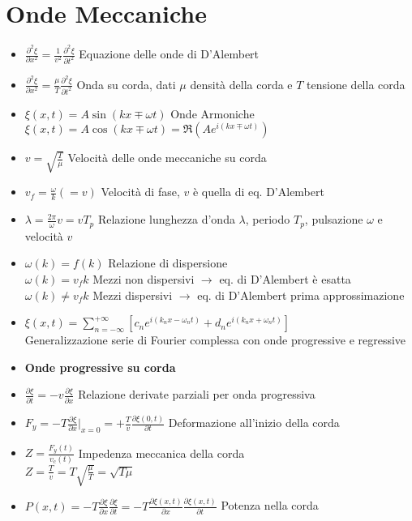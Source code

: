 \documentclass[a4paper]{article}
\begin{document}
\section{Onde Meccaniche}
 \begin{itemize}
 	\item $\frac{\partial^2 \xi}{\partial x^2}=\frac{1}{v^2} \frac{\partial^2 \xi}{\partial t^2}$ Equazione delle onde di D'Alembert
 	\item $\frac{\partial^2 \xi}{\partial x^2}=\frac{\mu}{T} \frac{\partial^2 \xi}{\partial t^2}$ Onda su corda, dati $\mu$ densità della corda e $T$ tensione della corda
 	\item $\xi(x,t)=A \sin(kx \mp \omega t)$ Onde Armoniche\\
 	$\xi(x,t)=A \cos(kx \mp \omega t)= \Re(Ae^{i(kx \mp \omega t)})$
 	\item $v=\sqrt{\frac{T}{\mu}}$ Velocità delle onde meccaniche su corda
 	\item $v_f = \frac{\omega}{k} (=v)$ Velocità di fase, $v$ è quella di eq. D'Alembert
 	\item $\lambda = \frac{2 \pi}{\omega}v=v T_p$ Relazione lunghezza d'onda $\lambda$, periodo $T_p$, pulsazione $\omega$ e velocità $v$
 	\item $\omega(k)=f(k)$ Relazione di dispersione\\
 	$\omega(k) = v_f k$ Mezzi non dispersivi $\rightarrow$ eq. di D'Alembert è esatta\\
 	$\omega(k) \neq v_f k$ Mezzi dispersivi $\rightarrow$ eq. di D'Alembert prima approssimazione
 	\item $\xi(x,t)=\sum_{n=-\infty}^{+\infty}[c_ne^{i(k_nx-\omega_nt)}+d_ne^{i(k_nx+\omega_nt)}]$\\
 	Generalizzazione serie di Fourier complessa con onde progressive e regressive
 	\item \textbf{Onde progressive su corda}
 	\item $\frac{\partial \xi}{\partial t}=-v \frac{\partial \xi}{\partial x}$ Relazione derivate parziali per onda progressiva
 	\item $F_y = -T \frac{\partial \xi}{\partial x}|_{x=0}= +\frac{T}{v} \frac{\partial \xi (0,t)}{\partial t}$ Deformazione all'inizio della corda
 	\item $Z=\frac{F_y(t)}{v_c(t)}$ Impedenza meccanica della corda\\
 	$Z=\frac{T}{v}=T \sqrt{\frac{\mu}{T}}=\sqrt{T \mu}$
 	\item $P(x,t)=-T \frac{\partial \xi}{\partial x} \frac{\partial \xi}{\partial t}=-T \frac{\partial \xi(x,t)}{\partial x} \frac{\partial \xi(x,t)}{\partial t}$ Potenza nella corda\\

\end{itemize}
\end{document}
